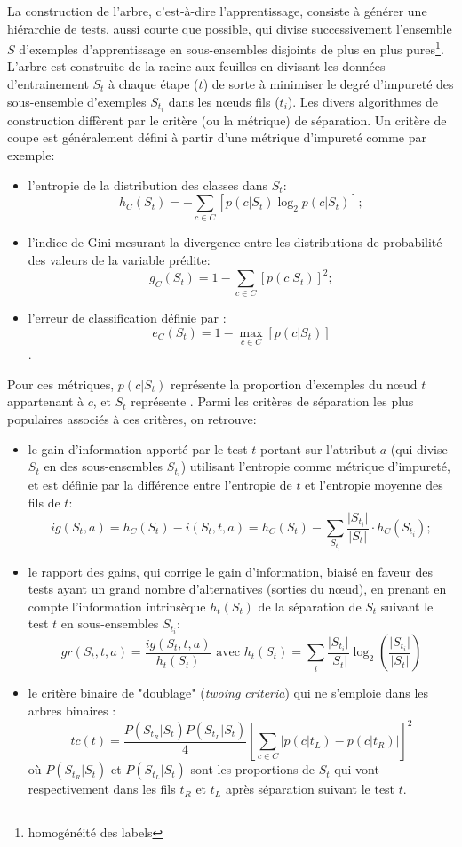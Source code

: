 La construction de l'arbre, c'est-à-dire l'apprentissage, consiste à générer une hiérarchie de tests, aussi courte que possible, qui divise successivement l'ensemble $S$ d'exemples d'apprentissage en sous-ensembles disjoints de plus en plus pures\footnote{homogénéité des labels}. %
L'arbre est construite de la racine aux feuilles en divisant les données d'entrainement $S_{t}$ à chaque étape ($t$) de sorte à minimiser le degré d'impureté des sous-ensemble d'exemples  $S_{t_i}$ dans les nœuds fils ($t_i$). Les divers algorithmes de construction diffèrent par le critère (ou la métrique) de séparation. Un critère de coupe est généralement défini à partir d'une métrique d'impureté comme par exemple:
\begin{itemize}
	\item l'entropie de la distribution des classes dans $S_t$: \[h_C(S_t) = - \sum\limits_{c \in C} \left[p(c \vert S_t) \log_2 p(c \vert S_t)\right];\]
	\item l'indice de Gini mesurant la divergence entre les distributions de probabilité des valeurs de la variable prédite: \[g_C(S_t) = 1 - \sum\limits_{c \in C} \left[p(c \vert S_t)\right]^2;\]
	\item l'erreur de classification définie par : \[e_C(S_t) = 1 - \max\limits_{c \in C} \left[p(c \vert S_t)\right]\]. 
\end{itemize}
Pour ces métriques, $p(c \vert S_t)$ représente la proportion d'exemples du nœud $t$ appartenant à $c$, et $S_t$ représente . Parmi les critères de séparation les plus populaires associés à ces critères, on retrouve: 

\begin{itemize}
	\item le gain d'information apporté par le test $t$ portant sur l'attribut $a$ (qui divise $S_t$ en des sous-ensembles $S_{t_i}$) utilisant l'entropie comme métrique d'impureté, et est définie par la différence entre l'entropie de $t$ et l'entropie moyenne des fils de $t$:  \[ig(S_t, a) = h_C(S_t) - i(S_t, t, a) =  h_C(S_t) - \sum\limits_{S_{t_i}} \frac{\vert S_{t_i} \vert}{\vert S_{t} \vert} \cdot h_C(S_{t_i});\]
	\item le rapport des gains, qui corrige le gain d'information, biaisé en faveur des tests ayant un grand nombre d'alternatives (sorties du nœud), en prenant en compte l'information intrinsèque $h_t(S_t)$ de la séparation de $S_t$ suivant le test $t$ en sous-ensembles $S_{t_i}$: \[gr(S_t, t, a) = \frac{ig(S_t, t, a)}{h_t(S_t)} \text{ avec } h_t(S_t) = \sum\limits_i \frac{\vert S_{t_i}\vert}{\vert S_t \vert} \log_2 \left(\frac{\vert S_{t_i}\vert}{\vert S_t \vert}\right)\]
	\item le critère binaire de "doublage" (\textit{twoing criteria}) qui ne s'emploie dans les arbres binaires : \[tc(t) = \frac{P(S_{t_R} \vert S_t)P(S_{t_L} \vert S_t)}{4} \left[\sum\limits_{c \in C} \vert p(c \vert t_L) - p(c \vert t_R)\vert\right]^2\] où  $P(S_{t_R} \vert S_t)$ et $P(S_{t_L} \vert S_t)$ sont les proportions de $S_t$ qui vont respectivement dans les fils $t_R$ et $t_L$ après séparation suivant le test $t$.
\end{itemize}

